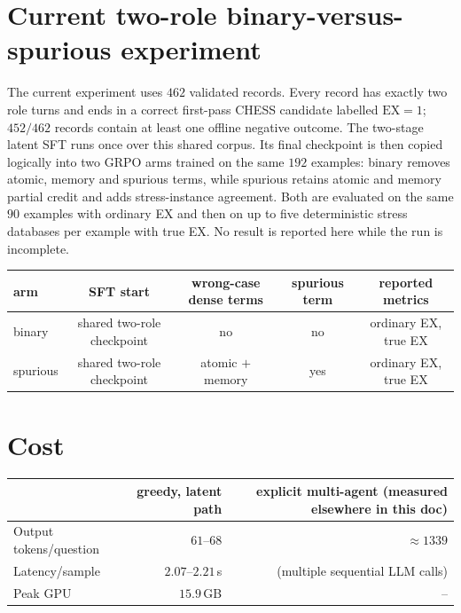 \documentclass[11pt]{article}
\theoremstyle{definition}
\begin{document}
\begin{center}
\end{center}

\section{Current two-role binary-versus-spurious experiment}

The current experiment uses $462$ validated records. Every record has exactly two role turns and ends in a correct first-pass CHESS candidate labelled $\mathrm{EX}=1$; $452/462$ records contain at least one offline negative outcome. The two-stage latent SFT runs once over this shared corpus. Its final checkpoint is then copied logically into two GRPO arms trained on the same $192$ examples: binary removes atomic, memory and spurious terms, while spurious retains atomic and memory partial credit and adds stress-instance agreement. Both are evaluated on the same $90$ examples with ordinary EX and then on up to five deterministic stress databases per example with true EX. No result is reported here while the run is incomplete.

\begin{center}
\begin{tabular}{lcccc}
\toprule
arm & SFT start & wrong-case dense terms & spurious term & reported metrics \\
\midrule
binary & shared two-role checkpoint & no & no & ordinary EX, true EX \\
spurious & shared two-role checkpoint & atomic $+$ memory & yes & ordinary EX, true EX \\
\bottomrule
\end{tabular}
\end{center}

\section{Cost}

\begin{center}
\begin{tabular}{lrr}
\toprule
& greedy, latent path & explicit multi-agent (measured elsewhere in this doc) \\
\midrule
Output tokens/question & $61$--$68$ & $\approx 1339$ \\
Latency/sample & $2.07$--$2.21$\,s & (multiple sequential LLM calls) \\
Peak GPU & $15.9$\,GB & -- \\
\bottomrule
\end{tabular}
\end{center}
\end{document}
